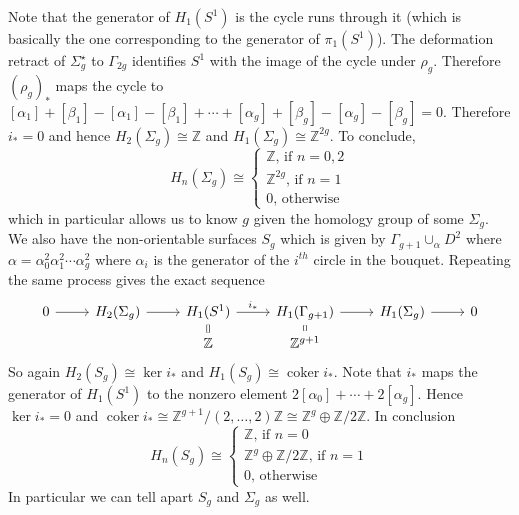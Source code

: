 Note that the generator of $H_1(S^1)$ is the cycle runs through it (which is basically the one corresponding to the generator of $\pi_1(S^1)$).
The deformation retract of $\Sigma_g^\star$ to $\Gamma_{2g}$ identifies $S^1$ with the image of the cycle under $\rho_g$.
Therefore $(\rho_g)_\ast$ maps the cycle to $[\alpha_1]+[\beta_1]-[\alpha_1]-[\beta_1]+\cdots+[\alpha_g]+[\beta_g]-[\alpha_g]-[\beta_g]=0$.
Therefore $i_\ast=0$ and hence $H_2(\Sigma_g)\cong\mathbb Z$ and $H_1(\Sigma_g)\cong\mathbb Z^{2g}$.
To conclude,
$$H_n(\Sigma_g)\cong\begin{cases}
    \mathbb Z\text{, if $n=0,2$}\\
    \mathbb Z^{2g}\text{, if $n=1$}\\
    0\text{, otherwise}
\end{cases}$$
which in particular allows us to know $g$ given the homology group of some $\Sigma_g$.\\
We also have the non-orientable surfaces $S_g$ which is given by $\Gamma_{g+1}\cup_\alpha D^2$ where $\alpha=\alpha_0^2\alpha_1^2\cdots\alpha_g^2$ where $\alpha_i$ is the generator of the $i^{th}$ circle in the bouquet.
Repeating the same process gives the exact sequence
\[
    \begin{tikzcd}[row sep=tiny]
        0\arrow{r}&H_2(\Sigma_g)\arrow{r}&H_1(S^1)\arrow{r}{i_\ast}&H_1(\Gamma_{g+1})\arrow{r}&H_1(\Sigma_g)\arrow{r}&0\\
        &&\mathbb Z\arrow[equal]{u}&\mathbb Z^{g+1}\arrow[equal]{u}&
    \end{tikzcd}
\]
So again $H_2(S_g)\cong\ker i_\ast$ and $H_1(S_g)\cong\operatorname{coker}i_\ast$.
Note that $i_\ast$ maps the generator of $H_1(S^1)$ to the nonzero element $2[\alpha_0]+\cdots+2[\alpha_g]$.
Hence $\ker i_\ast=0$ and $\operatorname{coker}i_\ast\cong\mathbb Z^{g+1}/(2,\ldots,2)\mathbb Z\cong\mathbb Z^g\oplus\mathbb Z/2\mathbb Z$.
In conclusion
$$H_n(S_g)\cong\begin{cases}
    \mathbb Z\text{, if $n=0$}\\
    \mathbb Z^g\oplus\mathbb Z/2\mathbb Z\text{, if $n=1$}\\
    0\text{, otherwise}
\end{cases}$$
In particular we can tell apart $S_g$ and $\Sigma_g$ as well.